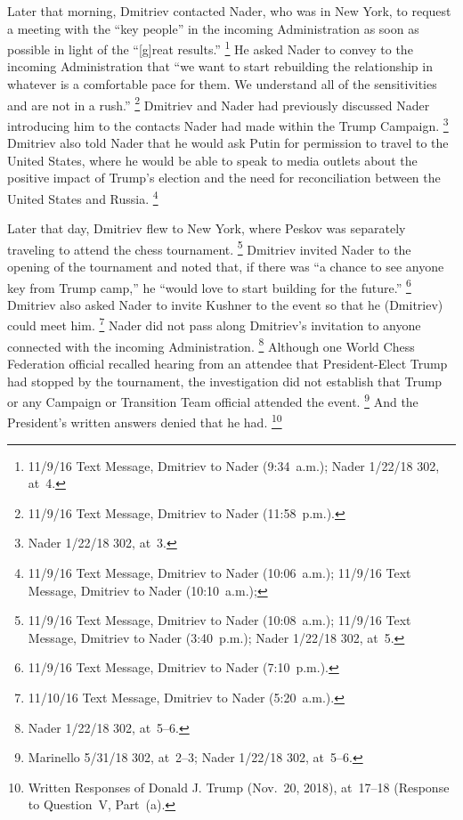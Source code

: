 Later that morning, Dmitriev contacted Nader, who was in New York, to request a meeting with the ``key people'' in the incoming Administration as soon as possible in light of the ``[g]reat results.''%
\footnote{11/9/16 Text Message, Dmitriev to Nader (9:34~a.m.);
Nader 1/22/18 302, at~4.}
He asked Nader to convey to the incoming Administration that ``we want to start rebuilding the relationship in whatever is a comfortable pace for them.
We understand all of the sensitivities and are not in a rush.''%
\footnote{11/9/16 Text Message, Dmitriev to Nader (11:58~p.m.).}
Dmitriev and Nader had previously discussed Nader introducing him to the contacts Nader had made within the Trump Campaign.%
\footnote{Nader 1/22/18 302, at~3.}
Dmitriev also told Nader that he would ask Putin for permission to travel to the United States, where he would be able to speak to media outlets about the positive impact of Trump's election and the need for reconciliation between the United States and Russia.%
\footnote{11/9/16 Text Message, Dmitriev to Nader (10:06~a.m.);
11/9/16 Text Message, Dmitriev to Nader (10:10~a.m.);
}

Later that day, Dmitriev flew to New York, where Peskov was separately traveling to attend the chess tournament.%
\footnote{11/9/16 Text Message, Dmitriev to Nader (10:08~a.m.);
11/9/16 Text Message, Dmitriev to Nader (3:40~p.m.);
Nader 1/22/18 302, at~5.}
Dmitriev invited Nader to the opening of the tournament and noted that, if there was ``a chance to see anyone key from Trump camp,'' he ``would love to start building for the future.''%
\footnote{11/9/16 Text Message, Dmitriev to Nader (7:10~p.m.).}
Dmitriev also asked Nader to invite Kushner to the event so that he (Dmitriev) could meet him.%
\footnote{11/10/16 Text Message, Dmitriev to Nader (5:20~a.m.).}
Nader did not pass along Dmitriev's invitation to anyone connected with the incoming Administration.%
\footnote{Nader 1/22/18 302, at~5--6.}
Although one World Chess Federation official recalled hearing from an attendee that President-Elect Trump had stopped by the tournament, the investigation did not establish that Trump or any Campaign or Transition Team official attended the event.%
\footnote{Marinello 5/31/18 302, at~2--3;
Nader 1/22/18 302, at~5--6.}
And the President's written answers denied that he had.%
\footnote{Written Responses of Donald J. Trump (Nov.~20, 2018), at~17--18 (Response to Question~V, Part~(a).}

